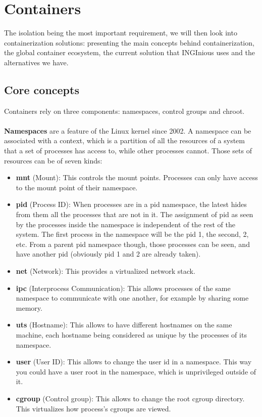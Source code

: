 \section{Containers}
The isolation being the most important requirement, we will then look into containerization solutions: presenting the main concepts behind containerization, the global container ecosystem, the current solution that INGInious uses and the alternatives we have.

\subsection{Core concepts}
Containers rely on three components: namespaces, control groups and chroot.
\paragraph{}\textbf{Namespaces} are a feature of the Linux kernel since 2002.  A namespace can be associated with a context, which is a partition of all the resources of a system that a set of processes has access to, while other processes cannot.  Those sets of resources can be of seven kinds:
\begin{itemize}
\renewcommand\labelitemi{--}
  \item \textbf{mnt} (Mount): This controls the mount points.  Processes can only have access to the mount point of their namespace.
  \item \textbf{pid} (Process ID): When processes are in a pid namespace, the latest hides from them all the processes that are not in it.  The assignment of pid as seen by the processes inside the namespace is independent of the rest of the system.  The first process in the namespace will be the pid 1, the second, 2, etc.  From a parent pid namespace though, those processes can be seen, and have another pid (obviously pid 1 and 2 are already taken).
  \item \textbf{net} (Network): This provides a virtualized network stack.
  \item \textbf{ipc} (Interprocess Communication): This allows processes of the same namespace to communicate with one another, for example by sharing some memory.
  \item \textbf{uts} (Hostname): This allows to have different hostnames on the same machine, each hostname being considered as unique by the processes of its namespace.
  \item \textbf{user} (User ID): This allows to change the user id in a namespace.  This way you could have a user root in the namespace, which is unprivileged outside of it.
  \item \textbf{cgroup} (Control group): This allows to change the root cgroup directory. This virtualizes how process's cgroups are viewed.
\end{itemize}

